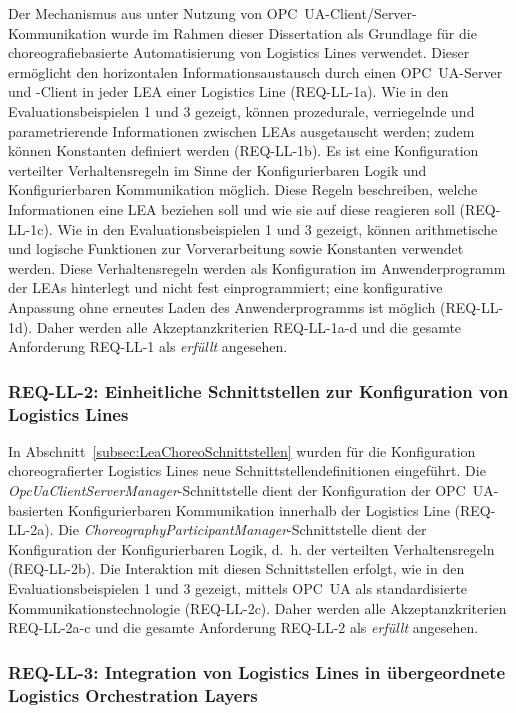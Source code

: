 Der Mechanismus aus \cite{Stutz.2026} unter Nutzung von OPC~UA-Client/Server-Kom\-mu\-ni\-ka\-ti\-on wurde im Rahmen dieser Dissertation als Grundlage für die choreografiebasierte Automatisierung von Logistics Lines verwendet. Dieser ermöglicht den horizontalen Informationsaustausch durch einen OPC~UA-Server und -Client in jeder LEA einer Logistics Line (REQ-LL-1a). Wie in den Evaluationsbeispielen 1 und 3 gezeigt, können prozedurale, verriegelnde und parametrierende Informationen zwischen LEAs ausgetauscht werden; zudem können Konstanten definiert werden (REQ-LL-1b). Es ist eine Konfiguration verteilter Verhaltensregeln im Sinne der Konfigurierbaren Logik und Konfigurierbaren Kommunikation möglich. Diese Regeln beschreiben, welche Informationen eine LEA beziehen soll und wie sie auf diese reagieren soll (REQ-LL-1c). Wie in den Evaluationsbeispielen 1 und 3 gezeigt, können arithmetische und logische Funktionen zur Vorverarbeitung sowie Konstanten verwendet werden. Diese Verhaltensregeln werden als Konfiguration im Anwenderprogramm der LEAs hinterlegt und nicht fest einprogrammiert; eine konfigurative Anpassung ohne erneutes Laden des Anwenderprogramms ist möglich (REQ-LL-1d). Daher werden alle Akzeptanzkriterien REQ-LL-1a-d und die gesamte Anforderung REQ-LL-1 als \emph{erfüllt} angesehen.

\subsubsection{REQ-LL-2: Einheitliche Schnittstellen zur Konfiguration von Logistics Lines}

In Abschnitt~\ref{subsec:LeaChoreoSchnittstellen} wurden für die Konfiguration choreografierter Logistics Lines neue Schnittstellendefinitionen eingeführt. Die \emph{OpcUaClientServerManager}-Schnittstelle dient der Konfiguration der OPC~UA-basierten Konfigurierbaren Kommunikation innerhalb der Logistics Line (REQ-LL-2a). Die \emph{ChoreographyParticipantManager}-Schnittstelle dient der Konfiguration der Konfigurierbaren Logik, d.~h. der verteilten Verhaltensregeln (REQ-LL-2b). Die Interaktion mit diesen Schnittstellen erfolgt, wie in den Evaluationsbeispielen 1 und 3 gezeigt, mittels OPC~UA als standardisierte Kommunikationstechnologie (REQ-LL-2c). Daher werden alle Akzeptanzkriterien REQ-LL-2a-c und die gesamte Anforderung REQ-LL-2 als \emph{erfüllt} angesehen.

\subsubsection{REQ-LL-3: Integration von Logistics Lines in übergeordnete Logistics Orchestration Layers}

